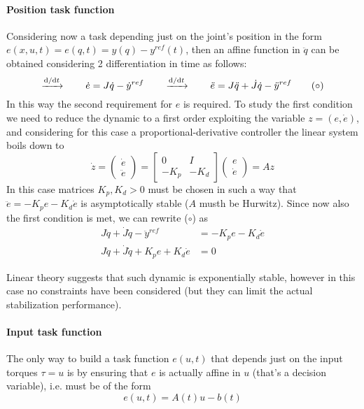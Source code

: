 	\paragraph{Position task function} Considering now a task depending just on the joint's position in the form $e(x,u,t) = e(q,t) = y(q) - y^{ref}(t)$, then an affine function in $\ddot q$ can be obtained considering 2 differentiation in time as follows:
	\[ \xrightarrow{\mathrm{d}/\mathrm{d} t} \qquad \dot e = J\dot q - \dot y^{ref} \qquad \xrightarrow{\mathrm{d}/\mathrm{d} t} \qquad \ddot e = J \ddot q + \dot J \dot q - \ddot y^{ref} \tag{$\circ$}  \]
	In this way the second requirement for $e$ is required. To study the first condition we need to reduce the dynamic to a first order exploiting the variable $z = (e,\dot e)$, and considering for this case a proportional-derivative controller the linear system boils down to
	\[ \dot z = \begin{pmatrix}
		\dot e \\ \ddot e
	\end{pmatrix} = \begin{bmatrix}
		0 & I \\ -K_p & - K_d
	\end{bmatrix} \begin{pmatrix}
		e \\ \dot e
	\end{pmatrix} = A z  \]
	In this case matrices $K_p,K_d > 0$ must be chosen in such a way that $\ddot e = -K_p e - K_d \dot e$ is asymptotically stable ($A$ musth be Hurwitz). Since now also the first condition is met, we can rewrite ($\circ$) as
	\begin{align*}
		J\ddot q + \dot J \dot q - \ddot y^{ref} & = - K_p e - K_d \dot e \\
		J\ddot q + \dot J \dot q + K_p e + K_d \dot e & = 0
	\end{align*}
	
	Linear theory suggests that such dynamic is exponentially stable, however in this case no constraints have been considered (but they can limit the actual stabilization performance).
	
	\paragraph{Input task function} The only way to build a task function $e(u, t)$ that depends just on the input torques $\tau = u$ is by ensuring that $e$ is actually affine in $u$ (that's a decision variable), i.e. must be of the form
	\[ e(u,t) = A(t) u - b(t) \]
	

